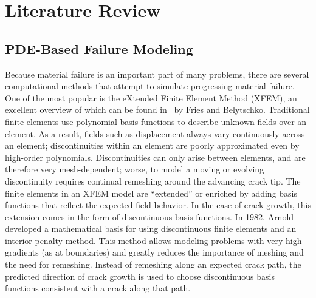 \chapter{Literature Review}
\section{PDE-Based Failure Modeling}
Because material failure is an important part of many problems, there are several computational methods that attempt to simulate progressing material failure. 
One of the most popular is the eXtended Finite Element Method (XFEM), an excellent overview of which can be found in~\cite{fries2010extended} by Fries and Belytschko.
Traditional finite elements use polynomial basis functions to describe unknown fields over an element.
As a result, fields such as displacement always vary continuously across an element; discontinuities within an element are poorly approximated even by high-order polynomials.
Discontinuities can only arise between elements, and are therefore very mesh-dependent; worse, to model a moving or evolving discontinuity requires continual remeshing around the advancing crack tip.
The finite elements in an XFEM model are ``extended'' or enriched by adding basis functions that reflect the expected field behavior. 
In the case of crack growth, this extension comes in the form of discontinuous basis functions.
In 1982, Arnold~\cite{arnold1982interior} developed a mathematical basis for using discontinuous finite elements and an interior penalty method.
This method allows modeling problems with very high gradients (as at boundaries) and greatly reduces the importance of meshing and the need for remeshing.
Instead of remeshing along an expected crack path, the predicted direction of crack growth is used to choose discontinuous basis functions consistent with a crack along that path.

